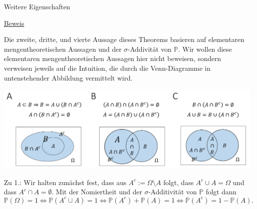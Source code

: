 \documentclass[
  8pt,
  ignorenonframetext,
]{beamer}
\begin{document}
\begin{frame}{Weitere Eigenschaften}
\protect\hypertarget{weitere-eigenschaften-1}{}
\footnotesize

\underline{Beweis}

Die zweite, dritte, und vierte Aussage dieses Theorems basieren auf
elementaren mengentheoretischen Aussagen und der \(\sigma\)-Addivität
von \(\mathbb{P}\). Wir wollen diese elementaren mengentheoretischen
Aussagen hier nicht beweisen, sondern verweisen jeweils auf die
Intuition, die durch die Venn-Diagramme in untenstehender Abbildung
vermittelt wird.

\vspace{2mm}

\begin{center}\includegraphics[width=0.9\linewidth]{3_Abbildungen/wtfi_3_venn_diagramme} \end{center}
\vspace{1mm}

Zu 1.: Wir halten zunächst fest, dass aus \(A^c := \Omega \setminus A\)
folgt, dass \(A^c \cup A = \Omega\) und dass \(A^c \cap A = \emptyset\).
Mit der Nomiertheit und der \(\sigma\)-Additivität von \(\mathbb{P}\)
folgt dann \begin{equation}
\mathbb{P}(\Omega) = 1
\Leftrightarrow
\mathbb{P}(A^c \cup A) = 1
\Leftrightarrow
\mathbb{P}(A^c) + \mathbb{P}(A)  = 1
\Leftrightarrow
\mathbb{P}(A^c) = 1 - \mathbb{P}(A).
\end{equation}
\end{frame}
\end{document}
